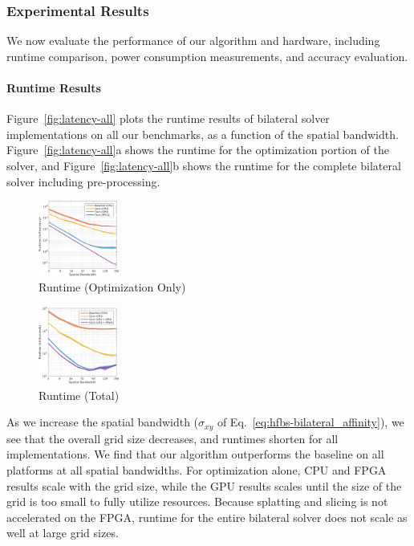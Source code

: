 \subsubsection{Experimental Results}

We now evaluate the performance of our algorithm and hardware, including runtime comparison, power consumption measurements, and accuracy evaluation.

\paragraph{Runtime Results}

Figure~\ref{fig:latency-all} plots the runtime results of bilateral solver implementations on all our benchmarks, as a function of the spatial bandwidth.
Figure~\ref{fig:latency-all}a shows the runtime for the optimization portion of the solver, and Figure~\ref{fig:latency-all}b shows the runtime for the complete bilateral solver including pre-processing.

  \begin{figure}[h!]
    \includegraphics[width=0.235\textwidth]{hfbs-figs/runtime_opt.png}
    \caption{Runtime (Optimization Only)}
  \end{figure}
  \begin{figure}[h!]
    \includegraphics[width=0.235\textwidth]{hfbs-figs/runtime_total.png}
    \caption{Runtime (Total)}
  \end{figure}


As we increase the spatial bandwidth ($\sigma_{xy}$ of Eq.~\ref{eq:hfbs-bilateral_affinity}), we see that the overall grid size decreases, and runtimes shorten for all implementations.
We find that our algorithm outperforms the baseline on all platforms at all spatial bandwidths.
For optimization alone, CPU and FPGA results scale with the grid size, while the GPU results scales until the size of the grid is too small to fully utilize resources.
Because splatting and slicing is not accelerated on the FPGA, runtime for the entire bilateral solver does not scale as well at large grid sizes.

